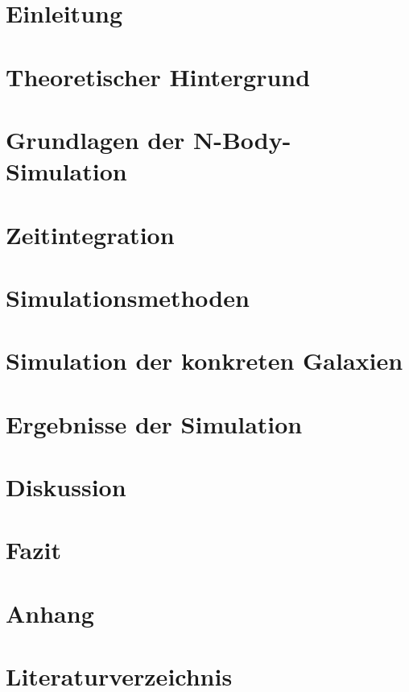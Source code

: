 \tableofcontents
\newpage

\section{Einleitung}
\label{sec:einleitung}

\section{Theoretischer Hintergrund}
\label{sec:theoretischer_hintergrund}

\section{Grundlagen der N-Body-Simulation}
\label{sec:grundlagen_nbody_simulation}

\section{Zeitintegration}
\label{sec:zeitintegration}

\section{Simulationsmethoden}
\label{sec:simulationsmethoden}

\section{Simulation der konkreten Galaxien}
\label{sec:simulation_konkret}

\section{Ergebnisse der Simulation}
\label{sec:ergebnisse_simulation}

\section{Diskussion}
\label{sec:diskussion}

\section{Fazit}
\label{sec:fazit}

\section{Anhang}
\label{sec:anhang}

\section{Literaturverzeichnis}
\label{sec:literaturverzeichnis}

